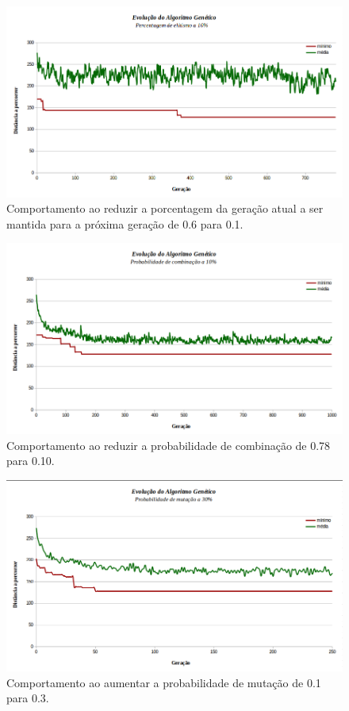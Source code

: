 \begin{figure}[!h]
    \centering
    \includegraphics[width=\linewidth]{Imagens/perc_elitismo=10.png}
    \caption{Comportamento ao reduzir a porcentagem da geração atual a ser mantida para a próxima geração de 0.6 para 0.1.}
    \label{fig:exp_perc_elitismo}
\end{figure}

\begin{figure}[!h]
    \centering
    \includegraphics[width=\linewidth]{Imagens/prob_combinacao=10.png}
    \caption{Comportamento ao reduzir a probabilidade de combinação de 0.78 para 0.10.}
    \label{fig:exp_prob_combinacao}
\end{figure}

\begin{figure}[!h]
    \centering
    \includegraphics[width=\linewidth]{Imagens/prob_mutacao=30.png}
    \caption{Comportamento ao aumentar a probabilidade de mutação de 0.1 para 0.3.}
    \label{fig:exp_prob_mutacao}
\end{figure}